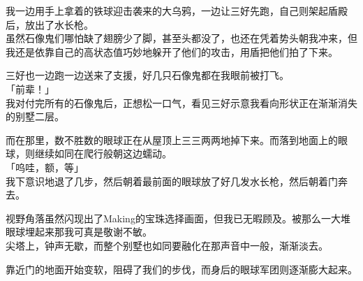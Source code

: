 我一边用手上拿着的铁球迎击袭来的大乌鸦，一边让三好先跑，自己则架起盾殿后，放出了水长枪。\\

虽然石像鬼们哪怕缺了翅膀少了脚，甚至头都没了，也还在凭着势头朝我冲来，但我还是依靠自己的高状态值巧妙地躲开了他们的攻击，用盾把他们拍了下来。

三好也一边跑一边送来了支援，好几只石像鬼都在我眼前被打飞。\\

「前辈！」\\

我对付完所有的石像鬼后，正想松一口气，看见三好示意我看向形状正在渐渐消失的别墅二层。

而在那里，数不胜数的眼球正在从屋顶上三三两两地掉下来。而落到地面上的眼球，则继续如同在爬行般朝这边蠕动。\\

「呜哇，额，等」\\

我下意识地退了几步，然后朝着最前面的眼球放了好几发水长枪，然后朝着门奔去。

视野角落虽然闪现出了Making的宝珠选择画面，但我已无暇顾及。被那么一大堆眼球埋起来那我可真是敬谢不敏。\\

尖塔上，钟声无歇，而整个别墅也如同要融化在那声音中一般，渐渐淡去。

靠近门的地面开始变软，阻碍了我们的步伐，而身后的眼球军团则逐渐膨大起来。\\

